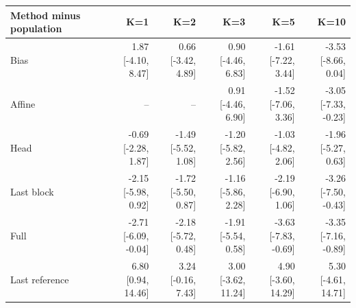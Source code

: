 \documentclass[11pt]{article}
\begin{document}
\begin{table}[!htbp]\centering\scriptsize\setlength{\tabcolsep}{3pt}
\begin{tabular}{lrrrrr}\toprule
Method minus population & K=1 & K=2 & K=3 & K=5 & K=10\\\midrule
Bias & \shortstack{1.87\\{[-4.10, 8.47]}} & \shortstack{0.66\\{[-3.42, 4.89]}} & \shortstack{0.90\\{[-4.46, 6.83]}} & \shortstack{-1.61\\{[-7.22, 3.44]}} & \shortstack{-3.53\\{[-8.66, 0.04]}}\\
Affine & -- & -- & \shortstack{0.91\\{[-4.46, 6.90]}} & \shortstack{-1.52\\{[-7.06, 3.36]}} & \shortstack{-3.05\\{[-7.33, -0.23]}}\\
Head & \shortstack{-0.69\\{[-2.28, 1.87]}} & \shortstack{-1.49\\{[-5.52, 1.08]}} & \shortstack{-1.20\\{[-5.82, 2.56]}} & \shortstack{-1.03\\{[-4.82, 2.06]}} & \shortstack{-1.96\\{[-5.27, 0.63]}}\\
Last block & \shortstack{-2.15\\{[-5.98, 0.92]}} & \shortstack{-1.72\\{[-5.50, 0.87]}} & \shortstack{-1.16\\{[-5.86, 2.28]}} & \shortstack{-2.19\\{[-6.90, 1.06]}} & \shortstack{-3.26\\{[-7.50, -0.43]}}\\
Full & \shortstack{-2.71\\{[-6.09, -0.04]}} & \shortstack{-2.18\\{[-5.72, 0.48]}} & \shortstack{-1.91\\{[-5.54, 0.58]}} & \shortstack{-3.63\\{[-7.83, -0.69]}} & \shortstack{-3.35\\{[-7.16, -0.89]}}\\
Last reference & \shortstack{6.80\\{[0.94, 14.46]}} & \shortstack{3.24\\{[-0.16, 7.43]}} & \shortstack{3.00\\{[-3.62, 11.24]}} & \shortstack{4.90\\{[-3.60, 14.29]}} & \shortstack{5.30\\{[-4.61, 14.71]}}\\

\end{tabular}
\end{table}
\end{document}
